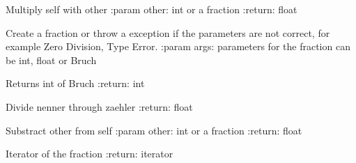 \documentclass[letterpaper,10pt,english]{sphinxmanual}
\begin{document}
\begin{fulllineitems}
\begin{fulllineitems}
\end{fulllineitems}


\begin{fulllineitems}
\label{bruch:bruch.Bruch.__imul__}
Multiply self with other
:param other: int or a fraction
:return: float

\end{fulllineitems}


\begin{fulllineitems}
\label{bruch:bruch.Bruch.__init__}
Create a fraction or throw a exception if the parameters are not correct, for example Zero Division, Type Error.
:param args: parameters for the fraction can be int, float or Bruch

\end{fulllineitems}


\begin{fulllineitems}
\label{bruch:bruch.Bruch.__int__}
Returns int of Bruch
:return: int

\end{fulllineitems}


\begin{fulllineitems}
\label{bruch:bruch.Bruch.__invert__}
Divide nenner through zaehler
:return: float

\end{fulllineitems}


\begin{fulllineitems}
\label{bruch:bruch.Bruch.__isub__}
Substract other from self
:param other: int or a fraction
:return: float

\end{fulllineitems}


\begin{fulllineitems}
\label{bruch:bruch.Bruch.__iter__}
Iterator of the fraction
:return: iterator


\end{fulllineitems}
\end{fulllineitems}
\end{document}
